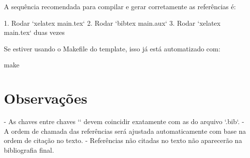 A sequência recomendada para compilar e gerar corretamente as referências é:

1. Rodar `xelatex main.tex`  
2. Rodar `bibtex main.aux`  
3. Rodar `xelatex main.tex` duas vezes

Se estiver usando o Makefile do template, isso já está automatizado com:

make

\section{Observações}

- As chaves entre chaves `{}` devem coincidir exatamente com as do arquivo `.bib`.
- A ordem de chamada das referências será ajustada automaticamente com base na ordem de citação no texto.
- Referências não citadas no texto não aparecerão na bibliografia final.
